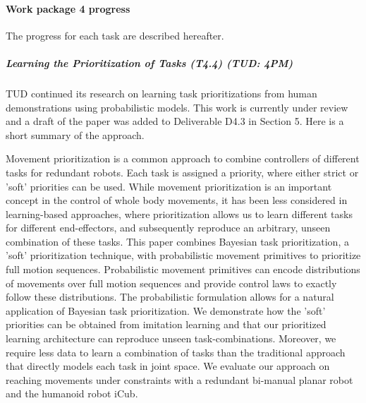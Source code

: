 

\paragraph{Work package 4 progress}

The progress for each task are described hereafter.

\subparagraph{Learning the Prioritization of Tasks (T4.4) (TUD: 4PM)}

TUD continued its research on learning task prioritizations from human demonstrations using probabilistic models. This work is currently under review and 
a draft of the paper was added to Deliverable D4.3 in Section 5.  Here is a short summary of the approach. 

Movement prioritization is a common approach
to combine controllers of different tasks for redundant robots.
Each task is assigned a priority, where either strict or 'soft'
priorities can be used. While movement prioritization is an
important concept in the control of whole body movements, it
has been less considered in learning-based approaches, where
prioritization allows us to learn different tasks for different
end-effectors, and subsequently reproduce an arbitrary, unseen
combination of these tasks. This paper combines Bayesian task
prioritization, a 'soft' prioritization technique, with probabilistic
movement primitives to prioritize full motion sequences.
Probabilistic movement primitives can encode distributions of
movements over full motion sequences and provide control
laws to exactly follow these distributions. The probabilistic
formulation allows for a natural application of Bayesian task
prioritization. We demonstrate how the 'soft' priorities can
be obtained from imitation learning and that our prioritized
learning architecture can reproduce unseen task-combinations.
Moreover, we require less data to learn a combination of tasks
than the traditional approach that directly models each task in
joint space. We evaluate our approach on reaching movements
under constraints with a redundant bi-manual planar robot
and the humanoid robot iCub. 

